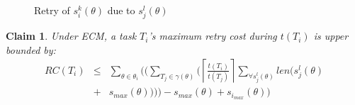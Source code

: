 \documentclass[a4paper,english]{article}
\newtheorem{clm}{Claim}
\begin{document}
\begin{figure}
{\label{fig5-c} 
}
\caption{Retry of $s_i^k(\theta)$ due to $s_j^l(\theta)$}  
\label{fig5}
\end{figure}

\begin{clm}\label{gedf-edf}
Under ECM, a task $T_i$'s maximum retry cost during $t(T_i)$ is upper bounded by:
\begin{eqnarray}
RC\left(T_{i}\right) & \le & \sum_{\theta\in\theta_{i}}\Big(\Big(\sum_{T_{j}\in\gamma(\theta)}\Big(\left\lceil\frac{t\left(T_{i}\right)}{t\left(T_{j}\right)}\right\rceil\sum_{\forall s_{j}^{l}(\theta)}len\big(s_{j}^{l}(\theta)\nonumber \\
 & + & s_{max}(\theta)\big)\Big)\Big)-s_{max}(\theta)+s_{i_{max}}(\theta)\Big)\label{eq3}\end{eqnarray}
\end{clm}
\end{document}
